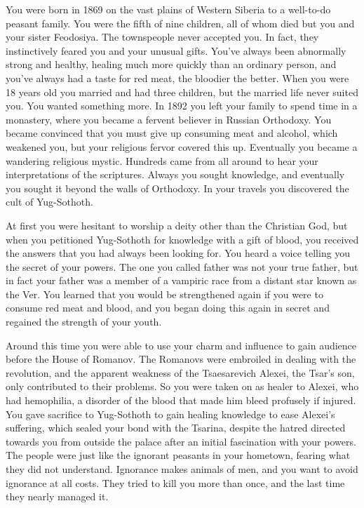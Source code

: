\documentclass[char]{guildcamp4}
\begin{document}
\name{\cRasputin{}}


You were born in 1869 on the vast plains of Western Siberia to a well-to-do peasant family. You were the fifth of nine children, all of whom died but you and your sister Feodosiya. The townspeople never accepted you. In fact, they instinctively feared you and your unusual gifts. You've always been abnormally strong and healthy, healing much more quickly than an ordinary person, and you've always had a taste for red meat, the bloodier the better. When you were 18 years old you married and had three children, but the married life never suited you. You wanted something more. In 1892 you left your family to spend time in a monastery, where you became a fervent believer in Russian Orthodoxy. You became convinced that you must give up consuming meat and alcohol, which weakened you, but your religious fervor covered this up. Eventually you became a wandering religious mystic. Hundreds came from all around to hear your interpretations of the scriptures. Always you sought knowledge, and eventually you sought it beyond the walls of Orthodoxy. In your travels you discovered the cult of Yug-Sothoth.

At first you were hesitant to worship a deity other than the Christian God, but when you petitioned Yug-Sothoth for knowledge with a gift of blood, you received the answers that you had always been looking for. You heard a voice telling you the secret of your powers. The one you called father was not your true father, but in fact your father was a member of a vampiric race from a distant star known as the Ver. You learned that you would be strengthened again if you were to consume red meat and blood, and you began doing this again in secret and regained the strength of your youth.

Around this time you were able to use your charm and influence to gain audience before the House of Romanov. The Romanovs were embroiled in dealing with the revolution, and the apparent weakness of the Tsaesarevich Alexei, the Tsar's son, only contributed to their problems. So you were taken on as healer to Alexei, who had hemophilia, a disorder of the blood that made him bleed profusely if injured. You gave sacrifice to Yug-Sothoth to gain healing knowledge to ease Alexei's suffering, which sealed your bond with the Tsarina, despite the hatred directed towards you from outside the palace after an initial fascination with your powers. The people were just like the ignorant peasants in your hometown, fearing what they did not understand. Ignorance makes animals of men, and you want to avoid ignorance at all costs. They tried to kill you more than once, and the last time they nearly managed it.
\end{document}
